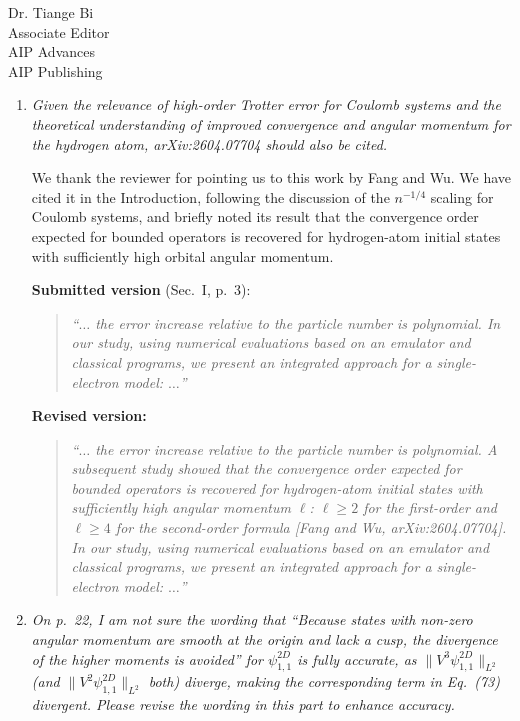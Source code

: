 \documentclass[11pt]{letter}
\begin{document}
\begin{letter}{Dr. Tiange Bi \\ Associate Editor \\ AIP Advances \\ AIP Publishing}
\begin{enumerate}
\item \textit{Given the relevance of high-order Trotter error for Coulomb
systems and the theoretical understanding of improved convergence and angular
momentum for the hydrogen atom, arXiv:2604.07704 should also be cited.}

We thank the reviewer for pointing us to this work by Fang and Wu. We have
cited it in the Introduction, following the discussion of the $n^{-1/4}$
scaling for Coulomb systems, and briefly noted its result that the
convergence order expected for bounded operators is recovered for
hydrogen-atom initial states with sufficiently high orbital angular momentum.

\smallskip
\noindent\textbf{Submitted version} (Sec.~I, p.~3):
\begin{quote}
\itshape
``$\dots$ the error increase relative to the particle number is polynomial.
In our study, using numerical evaluations based on an emulator and classical
programs, we present an integrated approach for a single-electron model:
$\dots$''
\end{quote}

\noindent\textbf{Revised version:}
\begin{quote}
\itshape
``$\dots$ the error increase relative to the particle number is polynomial. A
subsequent study showed that the convergence order expected for bounded
operators is recovered for hydrogen-atom initial states with sufficiently high
angular momentum $\ell$: $\ell \ge 2$ for the first-order and $\ell \ge 4$ for
the second-order formula [Fang and Wu, arXiv:2604.07704]. In our study, using
numerical evaluations based on an emulator and classical programs, we present
an integrated approach for a single-electron model: $\dots$''
\end{quote}

\item \textit{On p.~22, I am not sure the wording that ``Because states with
non-zero angular momentum are smooth at the origin and lack a cusp, the
divergence of the higher moments is avoided'' for $\psi^{2D}_{1,1}$ is fully
accurate, as $\|V^3\psi^{2D}_{1,1}\|_{L^2}$ (and $\|V^2\psi^{2D}_{1,1}\|_{L^2}$
both) diverge, making the corresponding term in Eq.~(73) divergent. Please
revise the wording in this part to enhance accuracy.}


\end{enumerate}
\end{letter}
\end{document}
